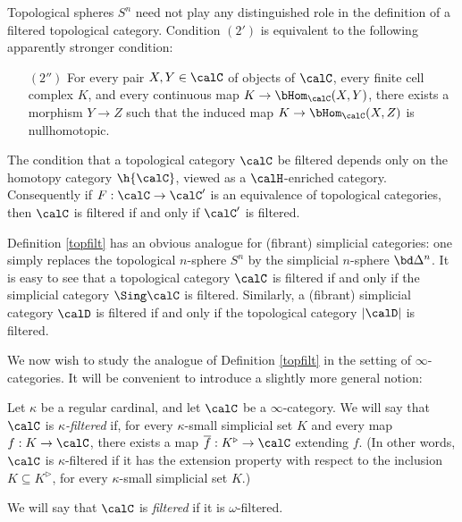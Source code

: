 \begin{remark}
Topological spheres $S^n$ need not play any distinguished role in the definition of a filtered topological category. Condition $(2')$ is equivalent to the following apparently stronger condition:
\begin{itemize}
\item[$(2'')$] For every pair $X, Y \in \calC$ of objects of $\calC$, every finite cell complex $K$, and every continuous map $K \rightarrow \bHom_{\calC}(X,Y)$, there exists a morphism $Y \rightarrow Z$ such that the induced map $K \rightarrow \bHom_{\calC}(X,Z)$ is nullhomotopic.
\end{itemize}
\end{remark}

\begin{remark}
The condition that a topological category $\calC$ be filtered depends only on the homotopy category $\h{\calC}$, viewed as a $\calH$-enriched category. Consequently if $F: \calC \rightarrow \calC'$ is an equivalence of topological categories, then $\calC$ is filtered if and only if $\calC'$ is filtered.
\end{remark}

\begin{remark}
Definition \ref{topfilt} has an obvious analogue for (fibrant) simplicial categories: one simply replaces the topological $n$-sphere $S^n$ by the simplicial $n$-sphere $\bd \Delta^n$. It is easy to see that a topological category $\calC$ is filtered if and only if the simplicial category $\Sing \calC$ is filtered. Similarly, a (fibrant) simplicial category $\calD$ is filtered if and only if the topological category $|\calD|$ is filtered.
\end{remark}

We now wish to study the analogue of Definition \ref{topfilt} in the setting of $\infty$-categories. It will be convenient to introduce a slightly more general notion:

\begin{definition}\label{filtquas}
Let $\kappa$ be a regular cardinal, and let $\calC$ be a $\infty$-category. We will say that
$\calC$ is {\it $\kappa$-filtered} if, for every $\kappa$-small simplicial set $K$ and every 
map $f: K \rightarrow \calC$, there exists a map $\overline{f}: K^{\triangleright} \rightarrow \calC$ extending $f$. (In other words, 
$\calC$ is $\kappa$-filtered if it has the extension property with respect to the inclusion
$K \subseteq K^{\triangleright}$, for every $\kappa$-small simplicial set $K$.)

We will say that $\calC$ is {\it filtered} if it is $\omega$-filtered.
\end{definition}

